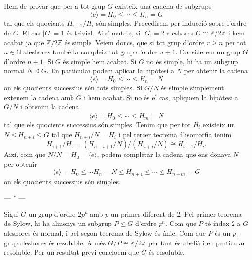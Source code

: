 \documentclass[12pt]{article}
\newcommand{\Z}{\mathbb{Z}}
\newcommand{\N}{\mathbb{N}}
\newcommand{\gen}[1]{\langle #1 \rangle}
\newcommand{\abs}[1]{\left\lvert #1 \right\rvert}
\newcommand{\normal}{\trianglelefteq}
\newcommand{\parbreak}{
	\begin{center}
		--- $\ast$ ---
	\end{center} 
}
\begin{document}
Hem de provar que per a tot grup \( G \) existeix una cadena de subgrups 
\begin{equation*}
	\gen{e} = H_0 \leq \cdots \leq H_n = G
\end{equation*}
tal que els quocients \( H_{i+1}/H_i \) són simples. Procedirem per inducció sobre l'ordre de \( G \). El cas \( \abs{G} = 1 \) és trivial. Així mateix, si \( \abs{G} = 2 \) aleshores \( G \cong \Z/2\Z \) i hem acabat ja que \( \Z/2\Z \) és simple. Veiem doncs, que si tot grup d'ordre  \( r \geq n \) per tot \( n \in \N \) aleshores també la compleix tot grup d'ordre \( n+1 \). Considerem un grup \( G \) d'ordre \( n+1 \). Si \( G \) és simple hem acabat. Si \( G \) no és simple, hi ha un subgrup normal \( N \normal G \). En particular podem aplicar la hipòtesi a \( N \) per obtenir la cadena
\begin{equation*}
	\gen{e} = H_0 \leq \cdots \leq H_n = N
\end{equation*}
on els quocients successius són tots simples. Si \( G/N \) és simple simplement extenem la cadena amb \( G \) i hem acabat. Si no és el cas, apliquem la hipòtesi a \( G/N \) i obtenim la cadena
\begin{equation*}
\gen{\bar{e}} = \bar{H}_0 \leq \cdots \leq \bar{H}_{m} = N
\end{equation*}
tal que els quocients successius són simples. Tenim que per tot \( \bar{H}_i \) existeix un	\( N \normal H_{n+i} \leq G \) tal que \( H_{n+i}/N = \bar{H}_i \) i pel tercer teorema d'isomorfia tenim
\begin{equation*}
	\bar{H}_{i+1}/\bar{H}_i = (H_{n+i+1}/N) / (H_{n+i}/N) \cong H_{i+1}/H_i.
\end{equation*}
Així, com que \( N/N = \bar{H}_{0} = \gen{\bar{e}} \), podem completar la cadena que ens donava \( N \) per obtenir
\begin{equation*}
\gen{e} = H_0 \leq \cdots H_n = N \leq H_{n+1} \leq \cdots \leq H_{n+m} = G 
\end{equation*}
on els quocients successius són simples. 

\parbreak

Sigui \( G \) un grup d'ordre \( 2p^n \) amb \( p \) un primer diferent de 2. Pel primer teorema de Sylow, hi ha almenys un subgrup \( P \leq G \) d'ordre \( p^n \). Com que \( P \) té índex 2 a \( G \) aleshores és normal, i pel segon teorema de Sylow és únic. Com que \( P \) és un \( p \)-grup aleshores és resoluble. A més \( G/P \cong \Z/2\Z \) per tant és abelià i en particular resoluble. Per un resultat previ concloem que \( G \) és resoluble. 
\end{document}
